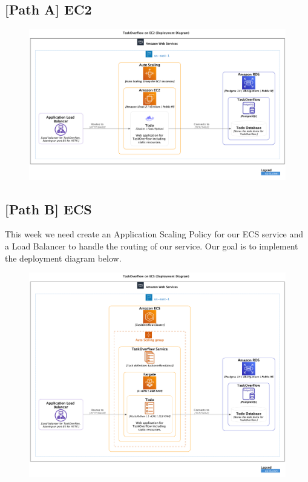 \documentclass{csse4400}
\begin{document}
\subsection{[Path A] EC2}



\begin{figure}[H]
  \includegraphics[width=\textwidth]{diagrams/ec2deployment}
\end{figure}

\subsection{[Path B] ECS}
\label{pathb}

This week we need create an Application Scaling Policy for our ECS service
and a Load Balancer to handle the routing of our service.
Our goal is to implement the deployment diagram below.

\begin{figure}[H]
  \includegraphics[width=\textwidth]{diagrams/ecsdeployment}
\end{figure}
\end{document}
